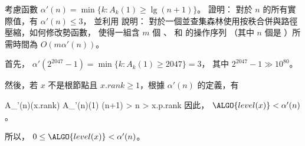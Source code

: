 \startEXERCISE\DIFFICULT
考慮函數 $\alpha'(n)=\min\{k:A_k(1)\ge\lg(n+1)\}$。
證明：
對於 $n$ 的所有實際值，有 $\alpha'(n)\le 3$，
並利用 \inexercise[19.4-2] 說明：
對於一個並查集森林使用按秩合併與路徑壓縮，如何修改勢函數，
使得一組含 $m$ 個 、  和  的操作序列
（其中 $n$ 個是 ）所需時間為 $O(m\alpha'(n))$。
\stopEXERCISE

\startANSWER
首先， $\alpha'(2^{2047}-1)=\min\{k:A_k(1)\ge 2047\} = 3$，
其中 $2^{2047}-1\gg 10^{80}$。

然後，若 $x$ 不是根節點且 $x.rank\ge 1$，根據 $\alpha'(n)$ 的定義，有

\startformula\startmathalignment
\NC A_{\alpha'(n)}(x.rank) \NC \ge A_{\alpha'(n)}(1) \NR
\NC \NC \ge \lg (n+1) \NR
\NC \NC > \lg n \NR
\NC \NC > x.p.rank \NR
\stopmathalignment\stopformula
因此， $\ALGO{level(x)} < \alpha'(n)$。

所以， $0\le \ALGO{level(x)} < \alpha'(n)$。
\stopANSWER